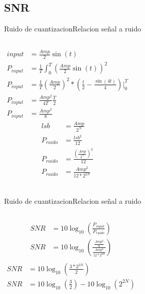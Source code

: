 \begin{darkframes}
   \subsection{SNR}
   \begin{frame}{Ruido de cuantizacion}{Relacion señal a ruido}
      \begin{columns}[onlytextwidth]
         \begin{align*}
         input&=\frac{Amp}{2}\sin(t) \\
         P_{input} &= \frac{1}{T} \int^T_0 \left(\frac{Amp}{2}\sin(t)\right)^2 \\
         P_{input} &= \frac{1}{T} \left(\frac{Amp}{2}\right)^2* \left( \frac{t}{2}-\frac{\sin(4t)}{4}\right)\Big\rvert^T_0 \\
         P_{input} &= \frac{Amp^2}{4T} \frac{T}{2}\\
         P_{input} &= \frac{Amp^2}{8} 
      \end{align*}
         \begin{align*}
            lsb       &= \frac{Amp}{2^N} \\
            P_{ruido} &= \frac{lsb^2}{12}\\
            P_{ruido} &= \frac{\left(\frac{Amp}{2^N}\right)^2}{12}\\
            P_{ruido} &= \frac{Amp^2}{12*2^{2N}}\\
         \end{align*}
      \end{columns}
      \vfill
   \end{frame}
   \begin{frame}{Ruido de cuantizacion}{Relacion señal a ruido}
      \begin{columns}[onlytextwidth]
         \begin{align*}
            SNR&=10 \log_{10} \left(\frac{P_{input}}{P_{ruido}} \right)\\
            SNR&=10 \log_{10}\left(\frac{\frac{Amp^2}{8}}{\frac{Amp^2}{12*2^{2N}}} \right) \\
         \end{align*}
         \begin{align*}
            SNR&=10 \log_{10}\left(\frac{3*2^{2N}}{2} \right)\\
            SNR&=10\log_{10}\left(\frac{3}{2}\right)-10\log_{10}\left(2^{2N}\right)

\end{align*}
\end{columns}
\end{frame}
\end{darkframes}
